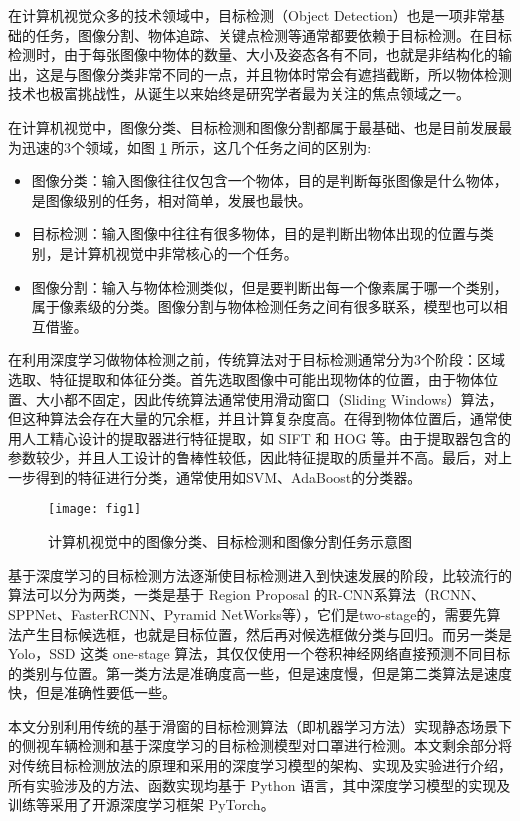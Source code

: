 
在计算机视觉众多的技术领域中，目标检测（Object Detection）也是一项非常基础的任务，图像分割、物体追踪、关键点检测等通常都要依赖于目标检测。在目标检测时，由于每张图像中物体的数量、大小及姿态各有不同，也就是非结构化的输出，这是与图像分类非常不同的一点，并且物体时常会有遮挡截断，所以物体检测技术也极富挑战性，从诞生以来始终是研究学者最为关注的焦点领域之一。

在计算机视觉中，图像分类、目标检测和图像分割都属于最基础、也是目前发展最为迅速的3个领域，如图 \ref{fig:cv_task} 所示，这几个任务之间的区别为:

\begin{itemize}
	\item 图像分类：输入图像往往仅包含一个物体，目的是判断每张图像是什么物体，是图像级别的任务，相对简单，发展也最快。
	\item 目标检测：输入图像中往往有很多物体，目的是判断出物体出现的位置与类别，是计算机视觉中非常核心的一个任务。
	\item 图像分割：输入与物体检测类似，但是要判断出每一个像素属于哪一个类别，属于像素级的分类。图像分割与物体检测任务之间有很多联系，模型也可以相互借鉴。
\end{itemize}

在利用深度学习做物体检测之前，传统算法对于目标检测通常分为3个阶段：区域选取、特征提取和体征分类。首先选取图像中可能出现物体的位置，由于物体位置、大小都不固定，因此传统算法通常使用滑动窗口（Sliding Windows）算法，但这种算法会存在大量的冗余框，并且计算复杂度高。在得到物体位置后，通常使用人工精心设计的提取器进行特征提取，如 SIFT 和 HOG 等。由于提取器包含的参数较少，并且人工设计的鲁棒性较低，因此特征提取的质量并不高。最后，对上一步得到的特征进行分类，通常使用如SVM、AdaBoost的分类器。

\begin{figure}[!ht]
  \centering
  \texttt{[image: fig1]}
  \caption{计算机视觉中的图像分类、目标检测和图像分割任务示意图}
  \label{fig:cv_task}
  \vspace{-0.5cm}
\end{figure}

基于深度学习的目标检测方法逐渐使目标检测进入到快速发展的阶段，比较流行的算法可以分为两类，一类是基于 Region Proposal 的R-CNN系算法（RCNN、SPPNet、FasterRCNN、Pyramid NetWorks等），它们是two-stage的，需要先算法产生目标候选框，也就是目标位置，然后再对候选框做分类与回归。而另一类是 Yolo，SSD 这类 one-stage 算法，其仅仅使用一个卷积神经网络直接预测不同目标的类别与位置。第一类方法是准确度高一些，但是速度慢，但是第二类算法是速度快，但是准确性要低一些。

本文分别利用传统的基于滑窗的目标检测算法（即机器学习方法）实现静态场景下的侧视车辆检测和基于深度学习的目标检测模型对口罩进行检测。本文剩余部分将对传统目标检测放法的原理和采用的深度学习模型的架构、实现及实验进行介绍，所有实验涉及的方法、函数实现均基于 Python 语言，其中深度学习模型的实现及训练等采用了开源深度学习框架 PyTorch。